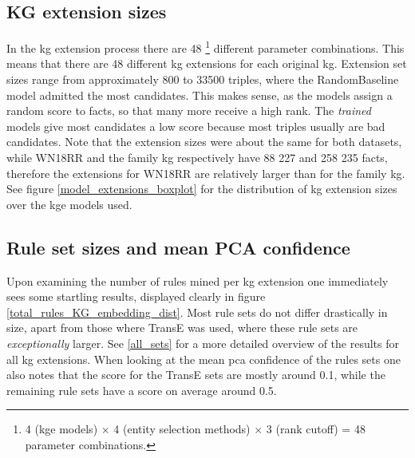 \subsection{KG extension sizes}
In the \gls{kg} extension process there are 48 \footnote{4 (\gls{kge} models) $\times$ 4 (entity selection methods) $\times$ 3 (rank cutoff) = 48 parameter combinations.} different parameter combinations. This means that there are 48 different \gls{kg} extensions for each original \gls{kg}. Extension set sizes range from approximately 800 to 33500 triples, where the RandomBaseline model admitted the most candidates. This makes sense, as the models assign a random score to facts, so that many more receive a high rank. The \textit{trained} models give most candidates a low score because most triples usually are bad candidates. Note that the extension sizes were about the same for both datasets, while WN18RR and the family \gls{kg} respectively have 88 227 and 258 235 facts, therefore the extensions for WN18RR are relatively larger than for the family \gls{kg}. See figure \ref{model_extensions_boxplot} for the distribution of \gls{kg} extension sizes over the \gls{kge} models used.

\subsection{Rule set sizes and mean PCA confidence}
\label{TransE_sucks} 
Upon examining the number of rules mined per \gls{kg} extension one immediately sees some startling results, displayed clearly in figure \ref{total_rules_KG_embedding_dist}. Most rule sets do not differ drastically in size, apart from those where TransE was used, where these rule sets are \textit{exceptionally} larger. See \cref{all_sets} for a more detailed overview of the results for all \gls{kg} extensions. When looking at the mean \gls{pca} confidence of the rules sets one also notes that the score for the TransE sets are mostly around 0.1, while the remaining rule sets have a score on average around 0.5.

